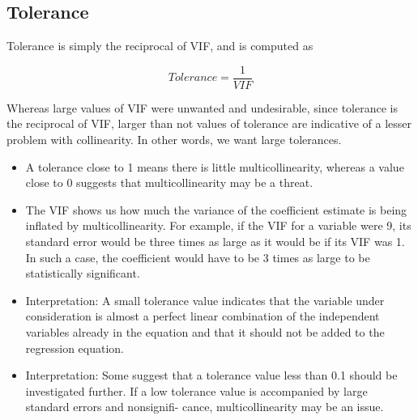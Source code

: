 \documentclass[a4paper,12pt]{article}
\begin{document}






\subsection*{Tolerance}
Tolerance is simply the reciprocal of VIF, and is computed as


\[ Tolerance = \frac{1}{VIF}\]

Whereas large values of VIF were unwanted and undesirable, since tolerance is the reciprocal
of VIF, larger than not values of tolerance are indicative of a lesser problem with collinearity.
In other words, we want large tolerances.

\begin{itemize}
\item A tolerance close to 1 means there is little multicollinearity, whereas a value close to 0
suggests that multicollinearity may be a threat.
\item The VIF shows us how much the variance of the coefficient estimate is being inflated by
multicollinearity. For example, if the VIF for a variable were 9, its standard error would
be three times as large as it would be if its VIF was 1. In such a case, the coefficient
would have to be 3 times as large to be statistically significant.
\item Interpretation: A small tolerance value indicates that the variable under consideration
is almost a perfect linear combination of the independent variables already in the equation
and that it should not be added to the regression equation.
\item Interpretation: Some suggest that a tolerance value less than 0.1 should be investigated
further. If a low tolerance value is accompanied by large standard errors and nonsignifi-
cance, multicollinearity may be an issue.
\end{itemize}
\end{document}

